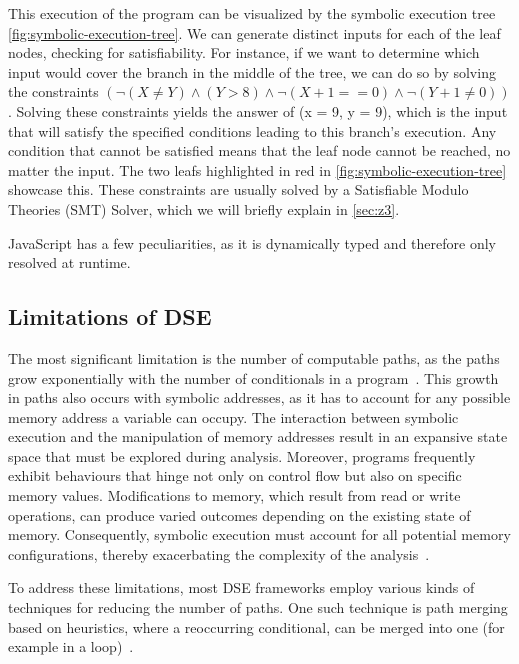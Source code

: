 This execution of the program can be visualized by the symbolic execution tree \autoref{fig:symbolic-execution-tree}.
We can generate distinct inputs for each of the leaf nodes, checking for satisfiability.
For instance, if we want to determine which input would cover the branch in the middle of the tree, we can do so by solving the constraints  $(\neg(X \neq Y) \land (Y > 8) \land \neg( X+1==0 ) \land \neg(Y+1 \neq 0 ))$. 
Solving these constraints yields the answer of (x = 9, y = 9), which is the input that will satisfy the specified conditions leading to this branch's execution. 
Any condition that cannot be satisfied means that the leaf node cannot be reached, no matter the input. The two leafs highlighted in red in  \autoref{fig:symbolic-execution-tree} showcase this. 
These constraints are usually solved by a Satisfiable Modulo Theories (SMT) Solver, which we will briefly explain in \autoref{sec:z3}.


JavaScript has a few peculiarities, as it is dynamically typed and therefore only resolved at runtime. 

\subsection{Limitations of DSE}

The most significant limitation is the number of computable paths, as the paths grow exponentially with the number of conditionals in a program~\cite{cadar_symbolic_2013}.
This growth in paths also occurs with symbolic addresses, as it has to account for any possible memory address a variable can occupy. The interaction between symbolic execution and the manipulation of memory addresses result in an expansive state space that must be explored during analysis. Moreover, programs frequently exhibit behaviours that hinge not only on control flow but also on specific memory values. Modifications to memory, which result from read or write operations, can produce varied outcomes depending on the existing state of memory. Consequently, symbolic execution must account for all potential memory configurations, thereby exacerbating the complexity of the analysis~\cite{elkarablieh_precise_2009}.

To address these limitations, most DSE frameworks employ various kinds of techniques for reducing the number of paths. 
One such technique is path merging based on heuristics, where a reoccurring conditional, can be merged into one (for example in a loop)~\cite{kuznetsov_efficient_2012}.

